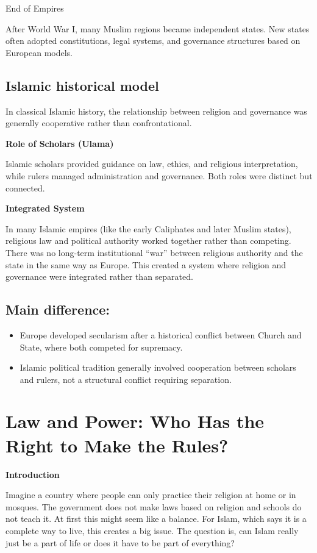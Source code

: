 \documentclass[12pt]{article}
\begin{document}
End of Empires

After World War I, many Muslim regions became independent states. New states often adopted constitutions, legal systems, and governance structures based on European models.

\subsection*{Islamic historical model}

In classical Islamic history, the relationship between religion and governance was generally cooperative rather than confrontational.

\textbf{Role of Scholars (Ulama)}

Islamic scholars provided guidance on law, ethics, and religious interpretation, while rulers managed administration and governance. Both roles were distinct but connected.

\textbf{Integrated System}

In many Islamic empires (like the early Caliphates and later Muslim states), religious law and political authority worked together rather than competing. There was no long-term institutional “war” between religious authority and the state in the same way as Europe. This created a system where religion and governance were integrated rather than separated.

\subsection*{Main difference:}

\begin{itemize}
\item Europe developed secularism after a historical conflict between Church and State, where both competed for supremacy.
\item Islamic political tradition generally involved cooperation between scholars and rulers, not a structural conflict requiring separation.
\end{itemize}
\newpage
\pagestyle{fancy}
\fancyhf{}
\cfoot{\thepage}

\section*{Law and Power: Who Has the Right to Make the Rules?}

\textbf{Introduction}

Imagine a country where people can only practice their religion at home or in mosques. The government does not make laws based on religion and schools do not teach it. At first this might seem like a balance. For Islam, which says it is a complete way to live, this creates a big issue. The question is, can Islam really just be a part of life or does it have to be part of everything?
\end{document}
